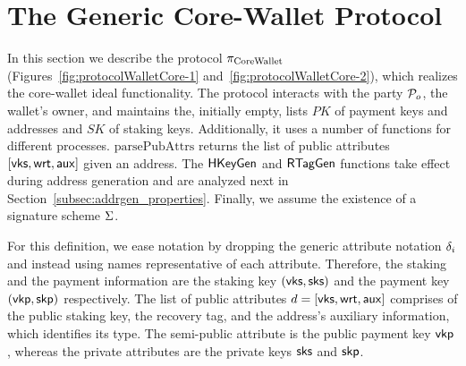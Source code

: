 \section{The Generic Core-Wallet Protocol}\label{sec:protocol-wallet}

In this section we describe the protocol $\pi_\mathrm{CoreWallet}$
(Figures~\ref{fig:protocolWalletCore-1} and~\ref{fig:protocolWalletCore-2}),
which realizes the core-wallet ideal functionality.  The protocol interacts
with the party $\mathcal{P}_{o}$, \ie the wallet's owner, and maintains the, initially
empty, lists $PK$ of payment keys and addresses and $SK$ of staking keys.
Additionally, it uses a number of functions for different processes.
$\mathrm{parsePubAttrs}$ returns the list of public attributes
$[\mathsf{vks}, \mathsf{wrt}, \mathsf{aux}]$ given an address. The $\mathsf{HKeyGen}$
and $\mathsf{RTagGen}$ functions take effect during address generation and
are analyzed next in Section~\ref{subsec:addrgen_properties}. Finally, we
assume the existence of a signature scheme $\Sigma$.

For this definition, we ease notation by dropping the generic attribute
notation $\delta_i$ and instead using names representative of each
attribute. Therefore, the staking and the payment information are the staking
key $(\mathsf{vks}, \mathsf{sks})$ and the payment key $(\mathsf{vkp}, \mathsf{skp})$ respectively. The
list of public attributes $d = [\mathsf{vks}, \mathsf{wrt}, \mathsf{aux}]$ comprises of the
public staking key, the recovery tag, and the address's auxiliary information,
which identifies its type. The semi-public attribute is the public payment key
$\mathsf{vkp}$, whereas the private attributes are the private keys
$\mathsf{sks}$ and $\mathsf{skp}$.

